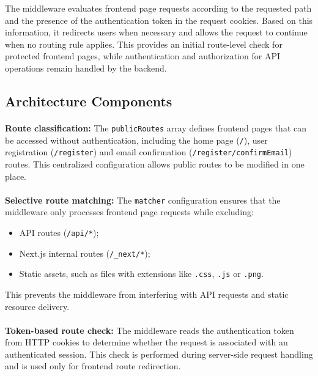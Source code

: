 The middleware evaluates frontend page requests according to the requested path and the presence of the authentication token in the request cookies. Based on this information, it redirects users when necessary and allows the request to continue when no routing rule applies. This provides an initial route-level check for protected frontend pages, while authentication and authorization for API operations remain handled by the backend.

\subsection{Architecture Components}

\paragraph{}\textbf{Route classification:}
The \texttt{publicRoutes} array defines frontend pages that can be accessed without authentication, including the home page (\texttt{/}), user registration (\texttt{/register}) and email confirmation (\texttt{/register/confirmEmail}) routes. This centralized configuration allows public routes to be modified in one place.

\paragraph{}\textbf{Selective route matching:}
The \texttt{matcher} configuration ensures that the middleware only processes frontend page requests while excluding:
\begin{itemize}
\item API routes (\texttt{/api/*});
\item Next.js internal routes (\texttt{/\_next/*});
\item Static assets, such as files with extensions like \texttt{.css}, \texttt{.js} or \texttt{.png}.
\end{itemize}

This prevents the middleware from interfering with API requests and static resource delivery.

\paragraph{}\textbf{Token-based route check:}
The middleware reads the authentication token from HTTP cookies to determine whether the request is associated with an authenticated session. This check is performed during server-side request handling and is used only for frontend route redirection.

